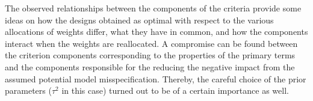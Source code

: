 The observed relationships between the components of the criteria provide some ideas on how the designs obtained as optimal with respect to the various allocations of weights differ, what they have in common, and how the components interact when the weights are reallocated. A compromise can be found between the criterion components corresponding to the properties of the primary terms and the components responsible for the reducing the negative impact from the assumed potential model misspecification. Thereby, the careful choice of the prior parameters ($\tau^2$ in this case) turned out to be of a certain importance as well. 

